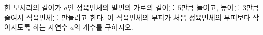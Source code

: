 \hspace*{2mm}\begin{minipage}[t]{\dimexpr\linewidth-2mm\relax}\vspace{0pt}
한 모서리의 길이가 $a$인 정육면체의 밑면의 가로의 길이를 $5$만큼 늘이고, 높이를 $3$만큼 줄여서 직육면체를 만들려고 한다. 이 직육면체의 부피가 처음 정육면체의 부피보다 작아지도록 하는 자연수 $a$의 개수를 구하시오.\end{minipage}
